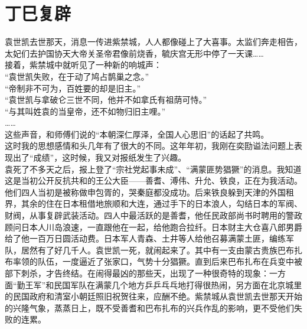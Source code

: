 \fancyhead[RO]{} %
\fancyhead[LE]{} %
\chapter*{丁巳复辟}
\thispagestyle{empty}
袁世凯去世那天，消息一传进紫禁城，人人都像碰上了大喜事。太监们奔走相告，太妃们去护国协天大帝关圣帝君像前烧香，毓庆宫无形中停了一天课……\\

接着，紫禁城中就听见了一种新的响城声：\\

“袁世凯失败，在于动了鸠占鹊巢之念。”\\

“帝制非不可为，百姓要的却是旧主。”\\

“袁世凯与拿破仑三世不同，他并不如拿氏有祖荫可恃。”\\

“与其叫姓袁的当皇帝，还不如物归旧主哩。”\\

……\\

这些声音，和师傅们说的“本朝深仁厚泽，全国人心思旧”的话起了共鸣。\\

这时我的思想感情和头几年有了很大的不同。这年年初，我刚在奕劻谥法问题上表现出了“成绩”，这时候，我又对报纸发生了兴趣。\\

袁死了不多天之后，报上登了“宗社党起事未成”、“满蒙匪势猖獗”的消息。我知道这是当初公开反抗共和的王公大臣——善耆、溥伟、升允、铁良，正在为我活动。他们四人当初是被称做申包胥的，哭秦庭都没成功。后来铁良躲到天津的外国租界，其余的住在日本租借地旅顺和大连，通过手下的日本浪人，勾结日本的军阀、财阀，从事复辟武装活动。四人中最活跃的是善耆，他任民政部尚书时聘用的警政顾问日本人川岛浪速，一直跟他在一起，给他跑合拉纤。日本财主大仓喜八郎男爵给了他一百万日圆活动费。日本军人青森、土井等人给他召募满蒙土匪，编练军队，居然有了好几千人。袁世凯一死，就闹起来了。其中有一支由蒙古贵族巴布扎布率领的队伍，一度逼近了张家口，气势十分猖獗。直到后来巴布扎布在兵变中被部下刺杀，才告终结。在闹得最凶的那些天，出现了一种很奇特的现象：一方面“勤王军”和民国军队在满蒙几个地方乒乒乓乓地打得很热闹，另方面在北京城里的民国政府和清室小朝廷照旧祝贺往来，应酬不绝。紫禁城从袁世凯去世那天开始的兴隆气象，蒸蒸日上，既不受善耆和巴布扎布的兴兵作乱的影响，更不受他们失败的连累。\\

